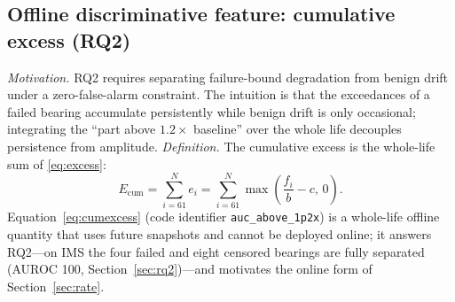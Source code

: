 \documentclass[journal]{IEEEtran}
\begin{document}
\subsection{Offline discriminative feature: cumulative excess (RQ2)}\label{sec:cumexcess}
\emph{Motivation.} RQ2 requires separating failure-bound degradation from benign drift under a zero-false-alarm constraint. The intuition is that the exceedances of a failed bearing accumulate persistently while benign drift is only occasional; integrating the ``part above $1.2\times$ baseline'' over the whole life decouples persistence from amplitude. \emph{Definition.} The cumulative excess is the whole-life sum of \eqref{eq:excess}:
\begin{equation}
E_{\mathrm{cum}}=\sum_{i=61}^{N}e_i=\sum_{i=61}^{N}\max\left(\frac{f_i}{b}-c,\,0\right).
\label{eq:cumexcess}
\end{equation}
Equation~\eqref{eq:cumexcess} (code identifier \texttt{auc\_above\_1p2x}) is a whole-life offline quantity that uses future snapshots and cannot be deployed online; it answers RQ2---on IMS the four failed and eight censored bearings are fully separated (AUROC 100, Section~\ref{sec:rq2})---and motivates the online form of Section~\ref{sec:rate}.
\end{document}
